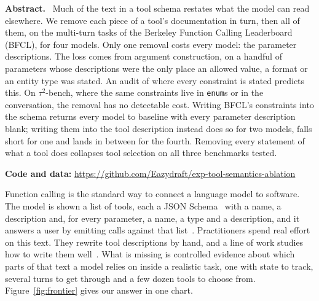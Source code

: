 \documentclass[10pt]{article}
\title{\papertitle}
\author{Randeep Singh}
\date{}
\makeatletter
\renewcommand\section{\@startsection{section}{1}{\z@}{-3.4ex plus -.8ex minus -.3ex}{1.2ex plus .2ex}{\normalfont\large\bfseries}}
\newcommand{\code}[1]{\texttt{#1}}
\renewenvironment{abstract}{\noindent\textbf{Abstract.}\ \ignorespaces}{\par}
\makeatother
\begin{document}
\maketitle
\pagestyle{bodypages}
\thispagestyle{firstpage}
\suppressfloats[t]

\begin{abstract}
Much of the text in a tool schema restates what the model can read elsewhere. We remove each piece of a tool's documentation in turn, then all of them, on the multi-turn tasks of the Berkeley Function Calling Leaderboard (BFCL), for four models. Only one removal costs every model: the parameter descriptions. The loss comes from argument construction, on a handful of parameters whose descriptions were the only place an allowed value, a format or an entity type was stated. An audit of where every constraint is stated predicts this. On $\tau^2$-bench, where the same constraints live in \code{enum}s or in the conversation, the removal has no detectable cost. Writing BFCL's constraints into the schema returns every model to baseline with every parameter description blank; writing them into the tool description instead does so for two models, falls short for one and lands in between for the fourth. Removing every statement of what a tool does collapses tool selection on all three benchmarks tested.
\end{abstract}

\noindent\textbf{Code and data:} \url{https://github.com/Eazydraft/exp-tool-semantics-ablation}

\section{Introduction}

Function calling is the standard way to connect a language model to software. The model is shown a list of tools, each a JSON Schema~\citep{jsonschema2020} with a name, a description and, for every parameter, a name, a type and a description, and it answers a user by emitting calls against that list~\citep{openai2023functioncalling,anthropic2024mcp}. Practitioners spend real effort on this text. They rewrite tool descriptions by hand, and a line of work studies how to write them well~\citep{hsieh2023tooldoc,yuan2025easytool,qu2025draft,guo2026rewrite}. What is missing is controlled evidence about which parts of that text a model relies on inside a realistic task, one with state to track, several turns to get through and a few dozen tools to choose from. Figure~\ref{fig:frontier} gives our answer in one chart.
\end{document}
